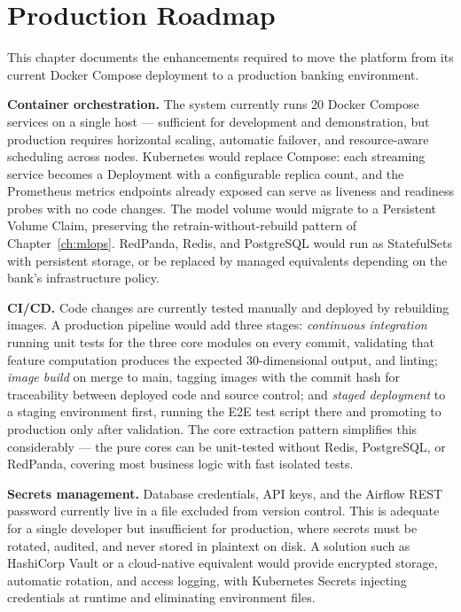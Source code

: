 \chapter{Production Roadmap}
\label{ch:roadmap}

This chapter documents the enhancements required to move the platform from its current Docker Compose deployment to a production banking environment.

\textbf{Container orchestration.} The system currently runs 20 Docker Compose services on a single host --- sufficient for development and demonstration, but production requires horizontal scaling, automatic failover, and resource-aware scheduling across nodes. Kubernetes would replace Compose: each streaming service becomes a Deployment with a configurable replica count, and the Prometheus metrics endpoints already exposed can serve as liveness and readiness probes with no code changes. The model volume would migrate to a Persistent Volume Claim, preserving the retrain-without-rebuild pattern of Chapter~\ref{ch:mlops}. RedPanda, Redis, and PostgreSQL would run as StatefulSets with persistent storage, or be replaced by managed equivalents depending on the bank's infrastructure policy.

\textbf{CI/CD.} Code changes are currently tested manually and deployed by rebuilding images. A production pipeline would add three stages: \emph{continuous integration} running unit tests for the three core modules on every commit, validating that feature computation produces the expected 30-dimensional output, and linting; \emph{image build} on merge to main, tagging images with the commit hash for traceability between deployed code and source control; and \emph{staged deployment} to a staging environment first, running the E2E test script there and promoting to production only after validation. The core extraction pattern simplifies this considerably --- the pure cores can be unit-tested without Redis, PostgreSQL, or RedPanda, covering most business logic with fast isolated tests.

\textbf{Secrets management.} Database credentials, API keys, and the Airflow REST password currently live in a  file excluded from version control. This is adequate for a single developer but insufficient for production, where secrets must be rotated, audited, and never stored in plaintext on disk. A solution such as HashiCorp Vault or a cloud-native equivalent would provide encrypted storage, automatic rotation, and access logging, with Kubernetes Secrets injecting credentials at runtime and eliminating environment files.

